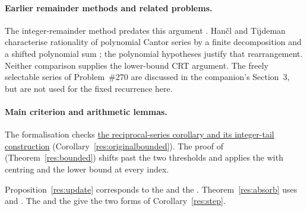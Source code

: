 \documentclass[11pt]{article}
\begin{document}
\paragraph{Earlier remainder methods and related problems.}
The integer-remainder method predates this argument
\cite[Theorem~2.1, pp.~85--86]{erdosstraus1974}.
Han\v{c}l and Tijdeman characterise rationality of polynomial Cantor
series by a finite decomposition and a shifted polynomial sum
\cite[Theorem~2.2 and its derivation, pp.~39--40]{hancltijdeman2008};
the polynomial hypotheses justify that rearrangement. Neither comparison
supplies the lower-bound CRT argument. The freely selectable series of
Problem~\#270 \cite[Theorems~1--2]{crmarickovac2025} are discussed in
the companion's Section~3, but are not used for the fixed recurrence here.

\paragraph{Main criterion and arithmetic lemmas.}
The formalisation checks \href{https://github.com/wcook04/plectis-erdos/blob/3d6d938d696fed0fb71dd55115a18a73738ff223/lean/ErdosProblems/Erdos243/PaperCompleteR7/ProductDefect.lean\#L211}{the reciprocal-series corollary and its integer-tail construction}
(Corollary~\ref{res:originalbounded}).
The proof of 
(Theorem~\ref{res:bounded}) shifts past the two thresholds and applies the 
with centring and the lower bound at every index.

Proposition~\ref{res:update} corresponds to the 
and the .
Theorem~\ref{res:absorb} uses 
and .
The 
and the 
give the two forms of Corollary~\ref{res:step}.
\end{document}
